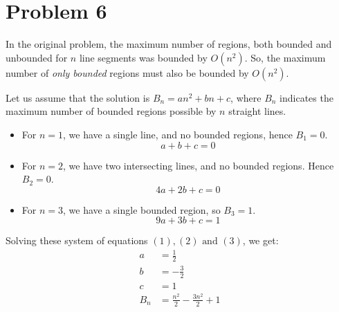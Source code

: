\section*{Problem 6}
In the original problem, the maximum number of regions, both bounded and unbounded for $n$ line segments was bounded by $O(n^2)$. So, the maximum number of \textit{only bounded} regions must also be bounded by $O(n^2)$.

Let us assume that the solution is $B_n=an^2+bn+c$, where $B_n$ indicates the maximum number of bounded regions possible by $n$ straight lines.
\begin{itemize}
    \item For $n=1$, we have a single line, and no bounded regions, hence $B_1 = 0$.
          \begin{equation}
              a+b+c=0 \tag{1}
          \end{equation}
    \item For $n=2$, we have two intersecting lines, and no bounded regions. Hence $B_2=0$.
          \begin{equation}
              4a+2b+c=0 \tag{2}
          \end{equation}
          \vspace{-.5cm}
          \begin{figure}[h!]
              \centering
          \end{figure}
    \item For $n=3$, we have a single bounded region, so $B_3=1$.
          \begin{equation}
              9a+3b+c = 1 \tag{3}
          \end{equation}
          \vspace{-.5cm}
          \begin{figure}[h!]
              \centering
          \end{figure}
\end{itemize}
Solving these system of equations $(1), (2) \text{ and } (3)$, we get:
\begin{align*}
    a   & =\frac{1}{2}                        \\
    b   & =-\frac{3}{2}                       \\
    c   & =1                                  \\
    B_n & =\frac{n^2}{2} - \frac{3n^2}{2} + 1
\end{align*}
\clearpage

